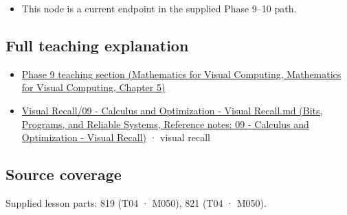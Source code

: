 \begin{itemize}
\tightlist
\item
  This node is a current endpoint in the supplied Phase 9--10 path.
\end{itemize}

\subsection{Full teaching explanation}\label{appendix-e2d476574aab-full-teaching-explanation}

\begin{itemize}
\tightlist
\item
  \href{../02-Mathematics-for-Visual-Computing/main.pdf\#nameddest=02-foundations-ii-ch021-multivariable-derivatives-and-sensitivity-1}{Phase 9 teaching section (Mathematics for Visual Computing, Mathematics for Visual Computing, Chapter 5)}
\item
  \href{../01-Bits-Programs-and-Reliable-Systems/main.pdf\#nameddest=appendix-adf48f5dc5c1}{Visual Recall/09 - Calculus and Optimization - Visual Recall.md (Bits, Programs, and Reliable Systems, Reference notes: 09 - Calculus and Optimization - Visual Recall)} · visual recall
\end{itemize}

\subsection{Source coverage}\label{appendix-e2d476574aab-source-coverage}

Supplied lesson parts: 819 (T04 · M050), 821 (T04 · M050).
